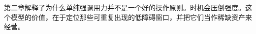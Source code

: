 \begin{summarybox}
第二章解释了为什么单纯强调用力并不是一个好的操作原则。时机会压倒强度。这个模型的价值，在于定位那些可重复出现的低障碍窗口，并把它们当作稀缺资产来经营。
\end{summarybox}
